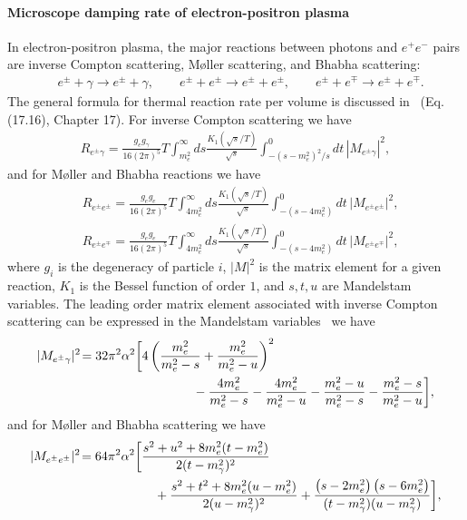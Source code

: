 \paragraph{Microscope damping rate of electron-positron plasma}
In electron-positron plasma, the major reactions between photons and $e^+e^-$ pairs are inverse Compton scattering, M{\o}ller scattering, and Bhabha scattering:
\begin{align}
&e^\pm+\gamma\longrightarrow e^\pm+\gamma,\qquad e^\pm+e^\pm\longrightarrow e^\pm+e^\pm,\qquad e^\pm+e^\mp\longrightarrow e^\pm+e^\mp.
\end{align}
The general formula for thermal reaction rate per volume is discussed in~\cite{Letessier:2002ony} (Eq.(17.16), Chapter 17). For inverse Compton scattering we have
\begin{align}
R_{e^{\pm}\gamma}=\frac{g_eg_\gamma}{16\left(2\pi\right)^5}T\int_{m_e^2}^\infty\!\!\!\!ds\frac{K_1(\sqrt{s}/T)}{\sqrt{s}}\int^0_{-(s-m_e^2)^2/s}\!\!\!\!\!\!\!\!\!\!\!\!\!\!\!\!dt\, |M_{e^{\pm}\gamma}|^2,
\end{align} 
and for M{\o}ller and Bhabha reactions we have
\begin{align}
&R_{e^\pm e^\pm}=\frac{g_eg_e}{16\left(2\pi\right)^5}T\!\!\int_{4m_e^2}^\infty\!\!\!\!ds\frac{K_1(\sqrt{s}/T)}{\sqrt{s}}\int^0_{-(s-4m_e^2)}\!\!\!\!\!\!\!\!\!\!\!\!\!\!\!\!dt\,|M_{e^\pm e^\pm}|^2,\\
&R_{e^\pm e^\mp}=\frac{g_eg_e}{16\left(2\pi\right)^5}T\!\!\int_{4m_e^2}^\infty\!\!\!\!ds\frac{K_1(\sqrt{s}/T)}{\sqrt{s}}\int^0_{-(s-4m_e^2)}\!\!\!\!\!\!\!\!\!\!\!\!\!\!\!\!dt\,|M_{e^\pm e^\mp}|^2,
\end{align}
where $g_i$ is the degeneracy of particle $i$, $|M|^2$ is the matrix element for a given reaction, $K_1$ is the Bessel function of order $1$, and $s,t,u$ are Mandelstam variables. The leading order matrix element associated with inverse Compton scattering can be expressed in the Mandelstam variables~\cite{Kuznetsova:2011wt,Kuznetsova:2009bq} we have
\begin{align}
|M_{e^\pm\gamma}|^2\!=32 \pi^2\alpha^2\bigg[&4\left(\frac{m_e^2}{m_e^2-s}+\frac{m_e^2}{m_e^2-u}\right)^2\notag\\
&\qquad\qquad-\frac{4m_e^2}{m_e^2-s}-\frac{4m_e^2}{m_e^2-u} -
 \frac{m_e^2-u}{m_e^2-s} -\frac{m_e^2-s}{m_e^2-u}\bigg],
\end{align}
and for M{\o}ller and Bhabha scattering we have 
\begin{align}
|M_{e^{\pm}e^{\pm}}|^{2}\!=64\pi^{2}\alpha^{2}\bigg[&
\frac{s^{2}+u^{2}+8m_e^{2}(t-m_e^{2})}{2(t-m^2_{\gamma})^{2}}\notag\\
&\quad+\frac{{s^{2}+t^{2}}+8m_e^{2}
(u-m_e^{2})}{2(u-m_{\gamma}^2)^{2}} + \frac{\left( {s}-2m_e^{2}\right)\left({s}-6m_e^{2}\right)}
{(t-m_{\gamma}^2)(u-m_{\gamma}^2)} \bigg],
\end{align}
